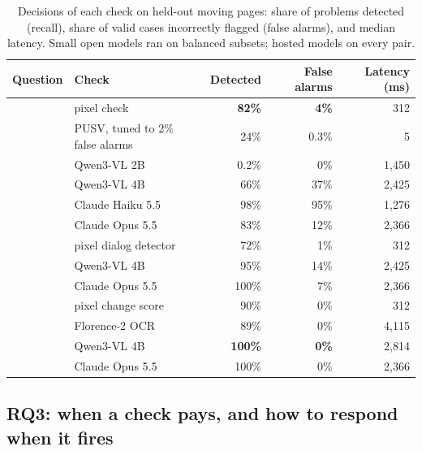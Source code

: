 \documentclass[10pt]{article}
\begin{document}
\begin{table}[t]
\centering\small\setlength{\tabcolsep}{6pt}
\caption{Decisions of each check on held-out moving pages: share of problems detected (recall), share of valid cases incorrectly flagged (false alarms), and median latency. Small open models ran on balanced subsets; hosted models on every pair.}
\label{tab:questions}
\begin{tabular}{llrrr}
\toprule
Question & Check & Detected & False alarms & Latency (ms) \\
\midrule
{}
 & pixel check & \textbf{82\%} & \textbf{4\%} & 312 \\
 & PUSV, tuned to 2\% false alarms & 24\% & 0.3\% & 5 \\
 & Qwen3-VL 2B & 0.2\% & 0\% & 1,450 \\
 & Qwen3-VL 4B & 66\% & 37\% & 2,425 \\
 & Claude Haiku 5.5 & 98\% & 95\% & 1,276 \\
 & Claude Opus 5.5 & 83\% & 12\% & 2,366 \\
\midrule
{}
 & pixel dialog detector & 72\% & 1\% & 312 \\
 & Qwen3-VL 4B & 95\% & 14\% & 2,425 \\
 & Claude Opus 5.5 & 100\% & 7\% & 2,366 \\
\midrule
{}
 & pixel change score & 90\% & 0\% & 312 \\
 & Florence-2 OCR & 89\% & 0\% & 4,115 \\
 & Qwen3-VL 4B & \textbf{100\%} & \textbf{0\%} & 2,814 \\
 & Claude Opus 5.5 & 100\% & 0\% & 2,366 \\
\bottomrule
\end{tabular}
\end{table}

\subsection{RQ3: when a check pays, and how to respond when it fires}
\label{sec:math-results}
\end{document}
